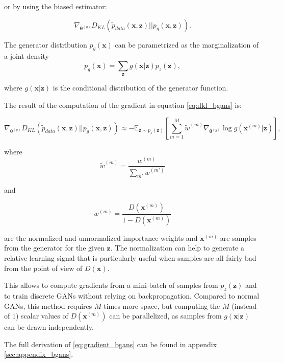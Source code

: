 or by using the biased estimator:

\begin{equation}
\label{eq:dkl_bgans}
\nabla_{\bm{\theta}^{(g)}} D_{KL}(\widetilde{p}_{data}(\bm{x}, \bm{z}) || p_g(\bm{x}, \bm{z})).
\end{equation}

The generator distribution $p_g(\bm{x})$ can be parametrized as the marginalization of a joint density
\begin{equation}
\label{eq:cond_prob_g}
p_g(\bm{x}) = \sum\limits_{\bm{z}} g(\bm{x}|\bm{z})p_z(\bm{z}), 
\end{equation}

where $g(\bm{x}|\bm{z})$ is the conditional distribution of the generator function.

The result of the computation of the gradient in equation \eqref{eq:dkl_bgans} is:

\begin{equation}
\label{eq:gradient_bgans}
\nabla_{\bm{\theta}^{(g)}} D_{KL}(\widetilde{p}_{data}(\bm{x}, \bm{z}) || p_g(\bm{x}, \bm{z})) \approx - \mathbb{E}_{\bm{z} \sim p_z(\bm{z})} [\sum\limits_{m = 1}^{M} \widetilde{w}^{(m)} \nabla_{\bm{\theta}^{(g)}} \log g(\bm{x}^{(m)} | \bm{z})],
\end{equation}

where
\[
\widetilde{w}^{(m)} = \frac{w^{(m)}}{\sum\limits_{m'} w^{(m')}} 
\]

and

\[
w^{(m)} = \frac{D(\bm{x}^{(m)})}{1 - D(\bm{x}^{(m)})} 
\]

are the normalized and unnormalized importance weights and $\bm{x}^{(m)}$ are samples from the generator for the given $\bm{z}$. The normalization can help to generate a relative learning signal that is particularly useful when samples are all fairly bad from the point of view of $D(\bm{x})$.


This allows to compute gradients from a mini-batch of samples from $p_z(\bm{z})$ and to train discrete GANs without relying on backpropagation. Compared to normal GANs, this method requires $M$ times more space, but computing the $M$ (instead of $1$) scalar values of $D(\bm{x}^{(m)})$ can be parallelized, as samples from $g(\bm{x} | \bm{z})$ can be drawn independently.

The full derivation of \eqref{eq:gradient_bgans} can be found in appendix \ref{sec:appendix_bgans}.


